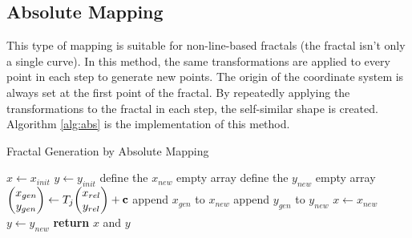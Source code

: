 \documentclass[12pt,a4paper]{article}
\begin{document}
    \subsection{Absolute Mapping}
    This type of mapping is suitable for non-line-based fractals (the fractal isn't only a single curve).
    In this method, the same transformations are applied to every point in each step to generate new points.
    The origin of the coordinate system is always set at the first point of the fractal. By repeatedly applying
    the transformations to the fractal in each step, the self-similar shape is created.
    Algorithm \ref{alg:abs} is the implementation of this method.
    \begin{algorithm}
        \caption{Fractal Generation by Absolute Mapping}
        \label{alg:abs}
        \begin{algorithmic}[1]
                \State $x \gets x_{init}$
                \State $y \gets y_{init}$
                    \State define the $x_{new}$ empty array
                    \State define the $y_{new}$ empty array
                            \State $\mqty(x_{gen} \\ y_{gen}) \gets T_j\mqty(x_{rel} \\ y_{rel}) + \vb{c}$
                            \State append $x_{gen}$ to $x_{new}$
                            \State append $y_{gen}$ to $y_{new}$
                        \EndFor
                    \EndFor
                    \State $x \gets x_{new}$
                    \State $y \gets y_{new}$
                \EndFor
                \State \textbf{return} $x$ and $y$
            \EndFunction
        \end{algorithmic}
    \end{algorithm}
\end{document}
